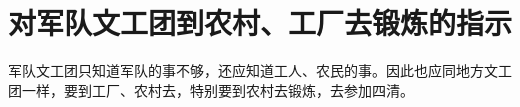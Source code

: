 \section[对军队文工团到农村、工厂去锻炼的指示（一九六五年七月十五日）]{对军队文工团到农村、工厂去锻炼的指示}


军队文工团只知道军队的事不够，还应知道工人、农民的事。因此也应同地方文工团一样，要到工厂、农村去，特别要到农村去锻炼，去参加四清。

